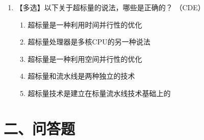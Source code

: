 \documentclass[12pt, a4paper]{article}
\begin{document}
\begin{enumerate}[label=\arabic*.]
    \item 【多选】以下关于超标量的说法，哪些是正确的？ （CDE） 
    \begin{enumerate}[label=\Alph*：]
        \item 超标量是一种利用时间并行性的优化 
        \item 超标量处理器是多核CPU的另一种说法 
        \item 超标量是一种利用空间并行性的优化 
        \item 超标量和流水线是两种独立的技术 
        \item 超标量技术是建立在标量流水线技术基础上的
    \end{enumerate}

\end{enumerate}

\vspace{1em}
\section*{二、问答题}
\end{document}
